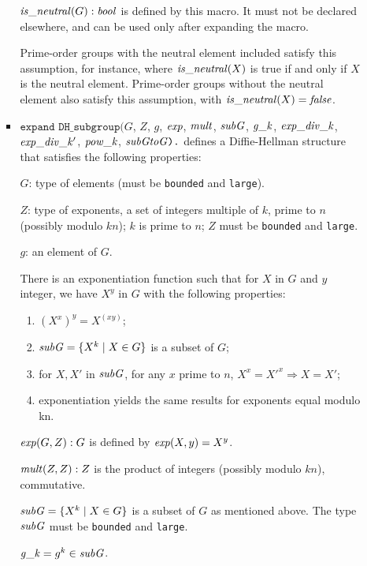 \documentclass{article}
\begin{document}
\begin{itemize}
\begin{itemize}
\begin{itemize}
       $\mathit{is\_neutral}(G):\mathit{bool}$ is defined by this macro. It must not be
       declared elsewhere, and can be used only after expanding the
       macro.

       Prime-order groups with the neutral element included satisfy
       this assumption, for instance, where $\mathit{is\_neutral}(X)$ is true
       if and only if $X$ is the neutral element.
       Prime-order groups without the neutral element also satisfy
       this assumption, with $\mathit{is\_neutral}(X) = \mathit{false}$.
       
     \item $\texttt{expand\ DH\_subgroup(}G$, $Z$, $g$, $\mathit{exp}$, $\mathit{mult}$, $\mathit{subG}$, $\mathit{g\_k}$, $\mathit{exp\_div\_k}$, $\mathit{exp\_div\_k'}$, $\mathit{pow\_k}$, $\mathit{subGtoG}\texttt{).}$ defines a Diffie-Hellman structure that satisfies the following properties:

       $G$: type of elements (must be \texttt{bounded} and \texttt{large}).
       
       $Z$: type of exponents, a set of integers multiple of $k$, prime to $n$ (possibly modulo $kn$);
       $k$ is prime to $n$; $Z$ must be \texttt{bounded} and \texttt{large}.

       $g$: an element of $G$.

       There is an exponentiation function such that for $X$ in $G$ and $y$ integer, we have $X^y$ in $G$ with the following properties:
       \begin{enumerate}
       \item $(X^x)^y = X^(xy)$;
       \item $\mathit{subG} = \{ X^k \mid X \in G \}$ is a subset of $G$;
       \item for $X, X'$ in $\mathit{subG}$, for any $x$ prime to $n$, $X^x = X'^x \Rightarrow X = X'$;
       \item exponentiation yields the same results for exponents equal modulo kn.
       \end{enumerate}

       $\mathit{exp}(G,Z):G$ is defined by $\mathit{exp}(X,y) = X^y $.

       $\mathit{mult}(Z,Z):Z$ is the product of integers (possibly modulo $kn$), commutative.

       $\mathit{subG} = \{ X^k \mid X \in G \}$ is a subset of $G$ as mentioned above.
       The type $\mathit{subG}$ must be \texttt{bounded} and \texttt{large}.

       $\mathit{g\_k} = g^k \in \mathit{subG}$.


\end{itemize}
\end{itemize}
\end{itemize}
\end{document}
